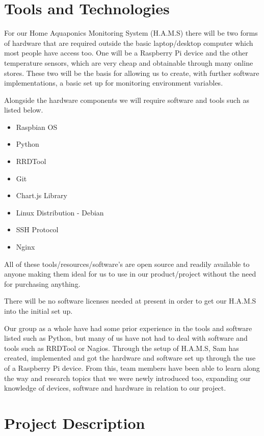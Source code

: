 \documentclass[11pt, oneside, a4paper, titlepage]{article}
\begin{document}


\part{Tools and Technologies}
For our Home Aquaponics Monitoring System (H.A.M.S) there will be two forms of hardware that are required outside the basic laptop/desktop computer which most people have access too. One will be a Raspberry Pi device and the other temperature sensors, which are very cheap and obtainable through many online stores. These two will be the basis for allowing us to create, with further software implementations, a basic set up for monitoring environment variables.  

Alongside the hardware components we will require software and tools such as listed below.  

\begin{itemize}
	\item Raspbian OS
	\item Python
	\item RRDTool
	\item Git
	\item Chart.js Library
	\item Linux Distribution - Debian
	\item SSH Protocol
	\item Nginx
\end{itemize}

All of these tools/resources/software's are open source and readily available to anyone making them ideal for us to use in our product/project without the need for purchasing anything. 

There will be no software licenses needed at present in order to get our H.A.M.S into the initial set up.  

Our group as a whole have had some prior experience in the tools and software listed such as Python, but many of us have not had to deal with software and tools such as RRDTool or Nagios. Through the setup of H.A.M.S, Sam has created, implemented and got the hardware and software set up through the use of a Raspberry Pi device. From this, team members have been able to learn along the way and research topics that we were newly introduced too, expanding our knowledge of devices, software and hardware in relation to our project.  

\part{Project Description}
\end{document}
